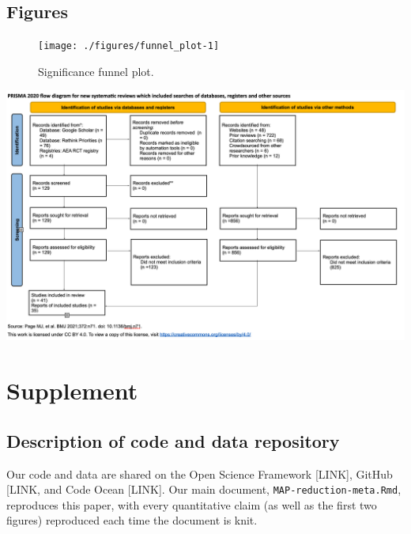 \documentclass[sn-nature,referee,pdflatex]{sn-jnl}
\begin{document}
\clearpage

\subsection{Figures}\label{figures}

\begin{figure}[H]

{\centering \texttt{[image: ./figures/funnel\_plot-1]} 

}

\caption{Significance funnel plot.}\label{fig:funnel_plot}
\end{figure}

\begin{center}\includegraphics[width=1.2\linewidth,]{./figures/prisma-diagram} \end{center}

\newpage

\section{Supplement}\label{Sec5}

\subsection{Description of code and data
repository}\label{description-of-code-and-data-repository}

Our code and data are shared on the Open Science Framework {[}LINK{]},
GitHub {[}LINK, and Code Ocean {[}LINK{]}. Our main document,
\texttt{MAP-reduction-meta.Rmd}, reproduces this paper, with every
quantitative claim (as well as the first two figures) reproduced each
time the document is knit.
\end{document}
